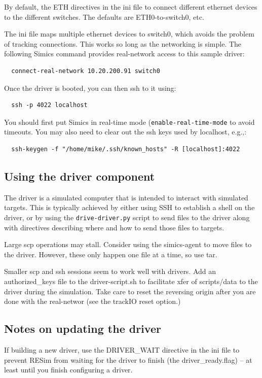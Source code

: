 \documentclass[titlepage]{article}
\begin{document}
\begin{appendices}
By default, the ETH directives in the ini file to connect different ethernet devices to the
different switches.  The defaults are ETH0-to-switch0, etc.

The ini file maps multiple ethernet devices to switch0, which avoids the problem of
tracking connections.  This works so long as the networking is simple.
The following Simics command provides real-network access to this sample driver:
\begin{verbatim}
  connect-real-network 10.20.200.91 switch0
\end{verbatim}
Once the driver is booted, you can then ssh to it using:
\begin{verbatim}
  ssh -p 4022 localhost
\end{verbatim}
You should first put Simics in real-time mode ({\tt enable-real-time-mode} to avoid timeouts.  You may also need to clear out the
ssh keys used by localhost, e.g.,:
\begin{verbatim}
  ssh-keygen -f "/home/mike/.ssh/known_hosts" -R [localhost]:4022
\end{verbatim}

\subsection{Using the driver component}
The driver is a simulated computer that is intended to interact with simulated targets.  This is typically
achieved by either using SSH to establish a shell on the driver, or by using the {\tt drive-driver.py}
script to send files to the driver along with directives describing where and how to send those files to
targets.

Large scp operations may stall.  Consider using the simics-agent to move files to the driver.  However,
these only happen one file at a time, so use tar.

Smaller scp and ssh sessions seem to work well with drivers.  Add an authorized\_keys file to the driver-script.sh to facilitate xfer of scripts/data to the driver
during the simulation.  Take care to reset the reversing origin after you are done with the real-networ (see the trackIO reset option.)


\subsection{Notes on updating the driver}
If building a new driver, use the DRIVER\_WAIT directive in the ini file to prevent RESim from waiting for the driver to finish 
(the driver\_ready.flag) -- at least until you finish configuring a driver.


\end{appendices}
\end{document}
